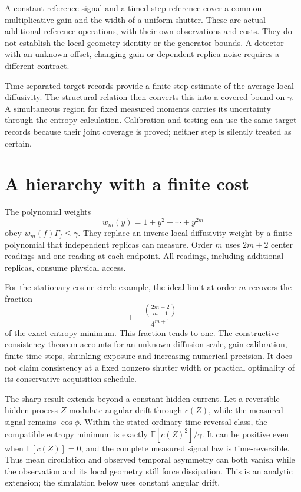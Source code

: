 A constant reference signal and a timed step reference cover a common
multiplicative gain and the width of a uniform shutter. These are actual
additional reference operations, with their own observations and costs.
They do not establish the local-geometry identity or the generator bounds.
A detector with an unknown offset, changing gain or dependent replica noise
requires a different contract.

Time-separated target records provide a finite-step estimate of the average
local diffusivity. The structural relation then converts this into a covered
bound on $\gamma$. A simultaneous region for fixed measured moments carries
its uncertainty through the entropy calculation. Calibration and testing can
use the same target records because their joint coverage is proved; neither
step is silently treated as certain.

\section{A hierarchy with a finite cost}

The polynomial weights
\[
 w_m(y)=1+y^2+\cdots+y^{2m}
\]
obey $w_m(f)\Gamma_f\leq\gamma$. They replace an inverse local-diffusivity
weight by a finite polynomial that independent replicas can measure. Order
$m$ uses $2m+2$ center readings and one reading at each endpoint. All readings,
including additional replicas, consume physical access.

For the stationary cosine-circle example, the ideal limit at order $m$
recovers the fraction
\[
 1-\frac{\binom{2m+2}{m+1}}{4^{m+1}}
\]
of the exact entropy minimum. This fraction tends to one. The constructive
consistency theorem accounts for an unknown diffusion scale, gain calibration,
finite time steps, shrinking exposure and increasing numerical precision.
It does not claim consistency at a fixed nonzero shutter width or practical
optimality of its conservative acquisition schedule.

The sharp result extends beyond a constant hidden current. Let a reversible
hidden process $Z$ modulate angular drift through $c(Z)$, while the measured
signal remains $\cos\phi$. Within the stated ordinary time-reversal class,
the compatible entropy minimum is exactly $\mathbb E[c(Z)^2]/\gamma$.
It can be positive even when $\mathbb E[c(Z)]=0$, and the complete measured
signal law is time-reversible. Thus mean circulation and observed temporal
asymmetry can both vanish while the observation and its local geometry still
force dissipation. This is an analytic extension; the simulation below uses
constant angular drift.

